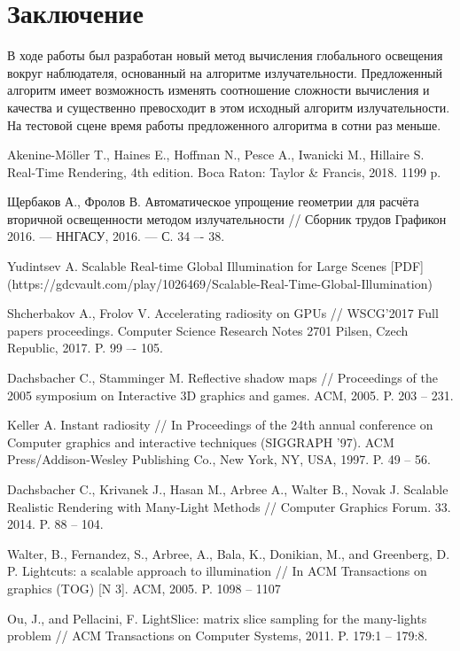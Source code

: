 \documentclass[oneside,final,12pt, a4paper]{extreport}
\newcommand{\sect}[1]{%
  \newpage%
  \section*{#1}%
  \addcontentsline{toc}{section}{#1}}
\begin{document}
\newpage

\sect{Заключение}

В ходе работы был разработан новый метод вычисления глобального освещения  вокруг наблюдателя, основанный на алгоритме излучательности.
Предложенный алгоритм имеет возможность изменять соотношение сложности вычисления и качества и существенно превосходит в этом исходный алгоритм излучательности.
На тестовой сцене время работы предложенного алгоритма в сотни раз меньше.



\begin{thebibliography}{00}

 Akenine-Möller T., Haines E., Hoffman N., Pesce A., Iwanicki M., Hillaire S. Real-Time Rendering, 4th edition. Boca Raton: Taylor \& Francis, 2018. 1199 p.

 Щербаков А., Фролов В. Автоматическое упрощение геометрии для расчёта вторичной освещенности методом излучательности // Сборник трудов Графикон 2016. — ННГАСУ, 2016. — С. 34 –- 38.

 Yudintsev A. Scalable Real-time Global Illumination for Large Scenes [PDF] (https://gdcvault.com/play/1026469/Scalable-Real-Time-Global-Illumination)

 Shcherbakov A., Frolov V. Accelerating radiosity on GPUs // WSCG'2017 Full papers proceedings. Computer Science Research Notes 2701 Pilsen, Czech Republic, 2017. P. 99 –- 105.

 Dachsbacher C., Stamminger M. Reflective shadow maps // Proceedings of the 2005 symposium on Interactive 3D graphics and games. ACM, 2005. P. 203 -- 231.

 Keller A. Instant radiosity // In Proceedings of the 24th annual conference on Computer graphics and interactive techniques (SIGGRAPH '97). ACM Press/Addison-Wesley Publishing Co., New York, NY, USA, 1997. P. 49 -- 56. 

 Dachsbacher C., Krivanek J., Hasan M., Arbree A., Walter B., Novak J. Scalable Realistic Rendering with Many-Light Methods // Computer Graphics Forum. 33. 2014. P. 88 -- 104.

 Walter, B., Fernandez, S., Arbree, A., Bala, K., Donikian, M., and Greenberg, D. P. Lightcuts: a scalable approach to illumination // In ACM Transactions on graphics (TOG) [N 3]. ACM, 2005. P. 1098 -- 1107

 Ou, J., and Pellacini, F. LightSlice: matrix slice sampling for the many-lights problem // ACM Transactions on Computer Systems, 2011. P. 179:1 -- 179:8.


\end{thebibliography}
\end{document}
